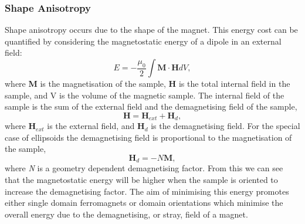         \subsubsection*{Shape Anisotropy}
        Shape anisotropy occurs due to the shape of the magnet. This energy cost can be quantified by considering the magnetostatic energy of a dipole in an external field:
		\begin{equation}\label{eq:magnetostaticenergy}
			E=-\dfrac{\mu_{0}}{2}\int \textbf{M}\cdot\textbf{H} dV,
		\end{equation}
		where \textbf{M} is the magnetisation of the sample, \textbf{H} is the total internal field in the sample, and V is the volume of the magnetic sample. The internal field of the sample is the sum of the external field and the demagnetising field of the sample,
		\begin{equation}\label{eq:internalfield}
			\textbf{H}=\textbf{H}_{ext} + \textbf{H}_{d},
		\end{equation}
		where $\textbf{H}_{ext}$ is the external field, and $\textbf{H}_{d}$ is the demagnetising field. For the special case of ellipsoids the demagnetising field is proportional to the magnetisation of the sample, 
		\begin{equation}\label{eq:demagfactor}
			\textbf{H}_{d}=-N\textbf{M},
		\end{equation}
		where \emph{N} is a geometry dependent demagnetising factor. From this we can see that the magnetostatic energy will be higher when the sample is oriented to increase the demagnetising factor. The aim of minimising this energy promotes either single domain ferromagnets or domain orientations which minimise the overall energy due to the demagnetising, or stray, field of a magnet.
		
